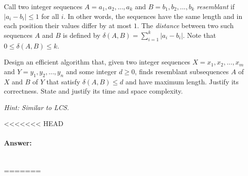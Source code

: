 \documentclass[11pt]{article}
\begin{document}

\begin{problem}
Call two integer sequences $A = a_1,a_2,...,a_k$ and $B = b_1,b_2,...,b_k$ \emph{resemblant}  if $|a_i - b_i| \le 1$ for all $i$. In other words, the sequences have the same length and  in each position their values differ by at most $1$. The \emph{distance} between two such sequences $A$ and $B$ is defined by $\delta(A,B) = \sum_{i=1}^k |a_i - b_i|$. Note that $0 \le \delta(A,B)\le k$.

Design an efficient algorithm that, given two integer sequences $X = x_1,x_2,...,x_m$ and $Y = y_1,y_2,...,y_n$ and some integer $d\ge 0$, 
finds resemblant subsequences $A$ of $X$ and $B$ of $Y$ that satisfy $\delta(A,B) \le d$ 
and have maximum length. Justify its correctness.  State and justify its time and space complexity.  

\noindent\emph{Hint: Similar to LCS.}
\end{problem}

<<<<<<< HEAD
\paragraph{Answer:}\mbox{} \\


=======
\end{document}
